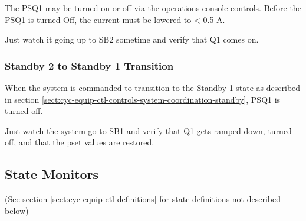 \documentclass[11pt]{book}		%
\begin{document}
The PSQ1 may be turned on or off via the operations console controls. Before the PSQ1 is turned Off, the current must be lowered to < 0.5 A.

\color{red}

Just watch it going up to SB2 sometime and verify that Q1 comes on.

\color{black}

\subsubsection{Standby 2 to Standby 1 Transition} \label{sect:cyc-equip-ctl-beamline-quad1-state-controls-sb2tosb1}

When the system is commanded to transition to the Standby 1 state as described in section \ref{sect:cyc-equip-ctl-controls-system-coordination-standby}, PSQ1 is turned off.

\color{red}

Just watch the system go to SB1 and verify that Q1 gets ramped down, turned off, and that the pset values are restored.

\color{black}


\subsection{State Monitors} \label{sect:cyc-equip-ctl-beamline-quad1-state-monitors}
(See section \ref{sect:cyc-equip-ctl-definitions} for state definitions not described below)
\end{document}
